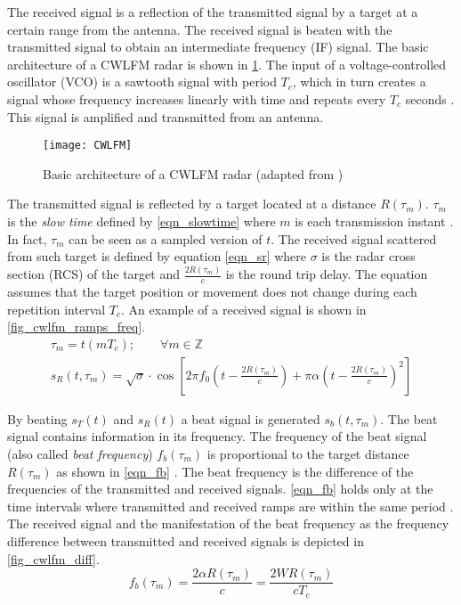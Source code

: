 The received signal is a reflection of the transmitted signal by a target at a certain range from the antenna. The received signal is beaten with the transmitted signal to obtain an intermediate frequency (IF) signal. The basic architecture of a CWLFM radar is shown in \cref{fig_cwlfm_arch}. The input of a voltage-controlled oscillator (VCO) is a sawtooth signal with period $T_c$, which in turn creates a signal whose frequency increases linearly with time and repeats every $T_c$ seconds \cite{Sardinero2022}. This signal is amplified and transmitted from an antenna.
\begin{figure}[ht]
	\centering
	\texttt{[image: CWLFM]}
	\caption[Basic architecture of a CWLFM radar]{Basic architecture of a CWLFM radar (adapted from \cite{Sardinero2022})}
	\label{fig_cwlfm_arch}
\end{figure}

The transmitted signal is reflected by a target located at a distance $R(\tau_m)$. $\tau_m$ is the \textit{slow time} defined by \cref{eqn_slowtime} where $m$ is each transmission instant \cite{Ziemer2009}. In fact, $\tau_m$ can be seen as a sampled version of $t$. The received signal scattered from such target is defined by equation \cref{eqn_sr} \cite{Ziemer2009,Sardinero2022} where $\sigma$ is the radar cross section (RCS) of the target and $\frac{2R(\tau_m)}{c}$ is the round trip delay. The equation assumes that the target position or movement does not change during each repetition interval $T_c$. An example of a received signal is shown in \cref{fig_cwlfm_ramps_freq}.
\begin{gather}
	\tau_m = t(m T_c); \qquad \forall m \in \mathbb{Z} \label{eqn_slowtime}\\
	s_R(t, \tau_m) = \sqrt{\sigma} \cdot \cos\left[ 2 \pi f_0 \left( t - \frac{2R(\tau_m)}{c}\right) + \pi \alpha \left( t - \frac{2R(\tau_m)}{c}\right)^2 \right] \label{eqn_sr}
\end{gather}

By beating $s_T(t)$ and $s_R(t)$ a beat signal is generated $s_b(t, \tau_m)$. The beat signal contains information in its frequency. The frequency of the beat signal (also called \textit{beat frequency}) $f_b(\tau_m)$ is proportional to the target distance $R(\tau_m)$ as shown in \cref{eqn_fb} \cite{Sardinero2022}. The beat frequency is the difference of the frequencies of the transmitted and received signals. \cref{eqn_fb} holds only at the time intervals where transmitted and received ramps are within the same period \cite{Sardinero2022}. The received signal and the manifestation of the beat frequency as the frequency difference between transmitted and received signals is depicted in \cref{fig_cwlfm_diff}.
\begin{equation} \label{eqn_fb}
	f_b(\tau_m)=\frac{2 \alpha R(\tau_m)}{c} = \frac{2 W R(\tau_m)}{c T_c}
\end{equation}

